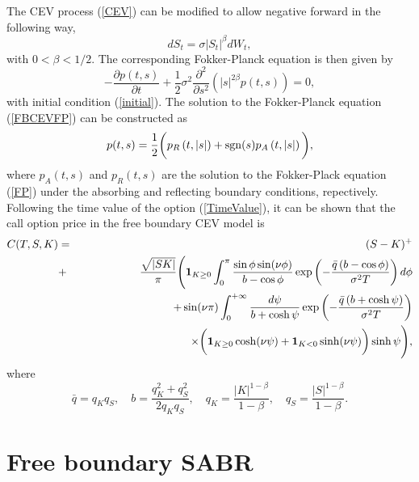 \documentclass[12pt]{article}
\begin{document}
  The CEV process (\ref{CEV}) can be modified to allow negative forward in the following way,
  \begin{equation}
    dS_t=\sigma \left|S_t\right|^{\beta}dW_t,
    \label{FreeBoundaryCEV}
  \end{equation}
  with $0<\beta<1/2$. The corresponding Fokker-Planck equation is then given by
  \begin{equation}
    -\frac{\partial p(t,s)}{\partial t}+\frac{1}{2}\sigma^2\frac{\partial^2}{\partial s^2}
    \left(\left|s\right|^{2\beta}p(t,s)\right) = 0,
    \label{FBCEVFP}
  \end{equation}
  with initial condition (\ref{initial}). The solution to the Fokker-Planck equation (\ref{FBCEVFP})
  can be constructed as
  \begin{equation}
    p(t,s)=\frac{1}{2}\bigg(p_R\left(t,\left|s\right|\right)+{\rm sgn}(s)p_A\left(t,\left|s\right|\right)\bigg),
  \end{equation}
  where $p_A(t,s)$ and $p_R(t,s)$ are the solution to the Fokker-Plack equation (\ref{FP}) under
  the absorbing and reflecting boundary conditions, repectively. Following the time value of the option (\ref{TimeValue}),
  it can be shown that the call option price in the free boundary CEV model is
  \begin{eqnarray}
    C(T,S,K) &=& (S-K)^+ \nonumber\\
             &+&\frac{\sqrt{\left|SK\right|}}{\pi}\Bigg({\bf 1}_{K\geq 0}\int_0^{\pi}\frac{\sin\phi\sin(\nu\phi)}{b-\cos\phi}
                        \exp\left(-\frac{\bar{q}\left(b-\cos\phi\right)}{\sigma^2T}\right)d\phi\nonumber\\
             &&\quad\quad\quad\quad\quad + \sin(\nu\pi)\int_0^{+\infty}
                \frac{d\psi}{b+\cosh \psi}
       \exp\left(-\frac{\bar{q}\left(b+\cosh \psi\right)}{\sigma^2T}\right)\nonumber\\
             &&\quad\quad\quad\quad\quad\quad\quad\quad\quad\quad \times
                  \bigg({\bf 1}_{K\geq 0}\cosh(\nu \psi)+{\bf 1}_{K< 0}\sinh(\nu \psi)\bigg)\sinh \psi\Bigg),
  \end{eqnarray}
  where
  \begin{equation}
    \bar{q}=q_Kq_S,\quad b=\frac{q_K^2+q_S^2}{2q_Kq_S},\quad q_K=\frac{|K|^{1-\beta}}{1-\beta},
    \quad q_S=\frac{|S|^{1-\beta}}{1-\beta}.
  \end{equation}



\section{Free boundary SABR}
\end{document}
